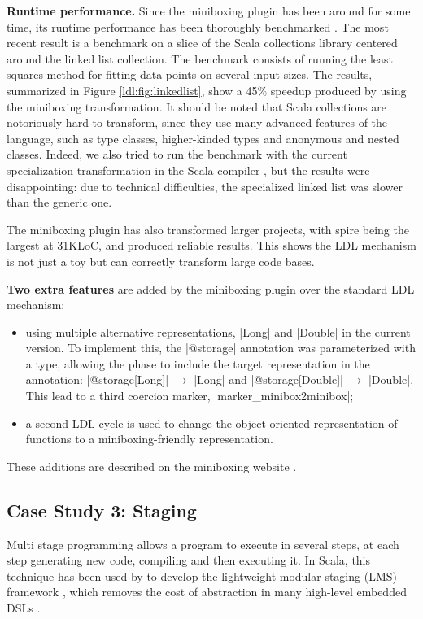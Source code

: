 \textbf{Runtime performance.} Since the miniboxing plugin has been around for some time, its runtime performance has been thoroughly benchmarked \cite{miniboxing}. The most recent result is a benchmark on a slice of the Scala collections library \cite{miniboxing-linkedlist} centered around the linked list collection. The benchmark consists of running the least squares method for fitting data points on several input sizes. The results, summarized in Figure \ref{ldl:fig:linkedlist}, show a 45\% speedup produced by using the miniboxing transformation. It should be noted that Scala collections are notoriously hard to transform, since they use many advanced features of the language, such as type classes, higher-kinded types and anonymous and nested classes. Indeed, we also tried to run the benchmark with the current specialization transformation in the Scala compiler \cite{iuli-thesis}, but the results were disappointing: due to technical difficulties, the specialized linked list was slower than the generic one.

The miniboxing plugin \cite{miniboxing-www} has also transformed larger projects, with spire \cite{erik-spire} being the largest at 31KLoC, and produced reliable results. This shows the LDL mechanism is not just a toy but can correctly transform large code bases.

\textbf{Two extra features} are added by the miniboxing plugin over the standard LDL mechanism:
\begin{itemize}
\item using multiple alternative representations, |Long| and |Double| in the current version. To implement this, the |@storage| annotation was parameterized with a type, allowing the \inject{} phase to include the target representation in the annotation: |@storage[Long]| $\rightarrow$ |Long| and |@storage[Double]| $\rightarrow$ |Double|. This lead to a third coercion marker, |marker_minibox2minibox|;
\item a second LDL cycle is used to change the object-oriented representation of functions to a miniboxing-friendly representation.
\end{itemize}
These additions are described on the miniboxing website \cite{miniboxing-www}.

\subsection{Case Study 3: Staging}
\label{ldl:sec:validation/staging}
Multi stage programming \cite{taha-intro} allows a program to execute in several steps, at each step generating new code, compiling and then executing it. In Scala, this technique has been used by  to develop the lightweight modular staging (LMS) framework \cite{tiark-lms, tiark-building-blocks}, which removes the cost of abstraction in many high-level embedded DSLs \cite{tiark-thesis, staged-sac, nada-js,stucki-odds,ackermann-jet}.


